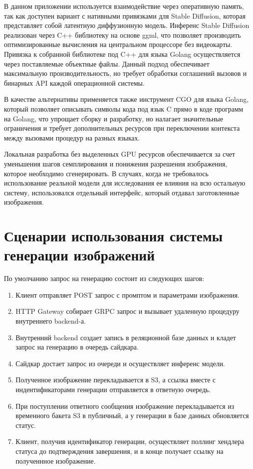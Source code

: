 В данном приложении используется взаимодействие через оперативную память, так как
доступен вариант с нативными привязками для Stable Diffusion, которая представляет собой
латентную диффузионную модель.
Инференс Stable Diffusion реализован через C++ библиотеку на основе ggml, что позволяет производить
оптимизированные вычисления на центральном процессоре без видеокарты.
Привязка к собранной библиотеке под C++ для языка Golang осуществляется через поставляемые 
объектные файлы. Данный подход обеспечивает максимальную производительность, но требует 
обработки соглашений вызовов и бинарных API каждой операционной системы. 

В качестве альтернативы применяется также инструмент CGO для языка Golang, который позволяет описывать
символы кода под язык C прямо в коде программ на Golang, что упрощает сборку и разработку, но налагает
значительные ограничения и требует дополнительных ресурсов при переключении контекста между
вызовами процедур на разных языках.

Локальная разработка без выделенных GPU ресурсов обеспечивается за счет уменьшения шагов семплирования
и понижения разрешения изображения, которое необходимо сгенерировать. В случаях, когда не требовалось
использование реальной модели для исследования ее влияния на всю остальную систему, использовался
отдельный интерфейс, который отдавал заготовленные изображения.

\section{Сценарии использования системы генерации изображений}
По умолчанию запрос на генерацию состоит из следующих шагов:
\begin{enumerate}
  \item Клиент отправляет POST запрос с промптом и параметрами изображения.
  \item HTTP Gateway собирает GRPC запрос и вызывает удаленную процедуру внутреннего backend-а.
  \item Внутренний backend создает запись в реляционной базе данных и кладет запрос на генерацию в очередь сайдкара.
  \item Сайдкар достает запрос из очереди и осуществляет инференс модели.
  \item Полученное изображение перекладывается в S3, а ссылка вместе с индентификаторами генерации отправляется в ответную очередь.
  \item При поступлении ответного сообщения изображение перекладывается из временного бакета S3 в публичный, а у генерации в базе данных обновляется статус.
  \item Клиент, получив идентификатор генерации, осуществляет поллинг хендлера статуса до подтверждения завершения, и в конце получает ссылку на полученнное изображение.
\end{enumerate}

